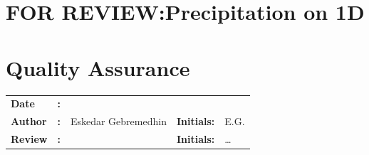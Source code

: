 

\section{FOR REVIEW:Precipitation on 1D}
\newrefsegment

\section*{Quality Assurance}
\begin{tabular}{@{}p{27mm}@{}p{0mm}p{\textwidth-52mm-48pt}p{15mm}p{10mm}}
\textbf{Date} & \textbf{:} &   \\ 
\textbf{Author} & \textbf{:} & Eskedar Gebremedhin  & \textbf{Initials:} & E.G. \\
\textbf{Review} & \textbf{:} &   & \textbf{Initials:} & \ldots 
\end{tabular}

